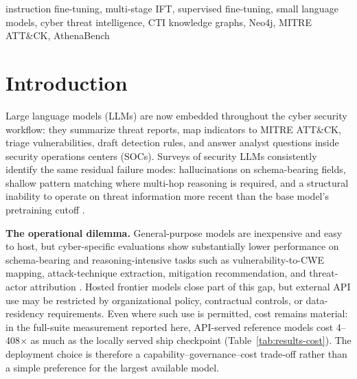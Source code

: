 \documentclass[conference]{IEEEtran}
\begin{document}
\begin{IEEEkeywords}
instruction fine-tuning, multi-stage IFT, supervised fine-tuning, small language models, cyber threat intelligence, CTI knowledge graphs, Neo4j, MITRE ATT\&CK, AthenaBench
\end{IEEEkeywords}

\section{Introduction}

Large language models (LLMs) are now embedded throughout the cyber security workflow: they summarize threat reports, map indicators to MITRE ATT\&CK, triage vulnerabilities, draft detection rules, and answer analyst questions inside security operations centers (SOCs). Surveys of security LLMs consistently identify the same residual failure modes: hallucinations on schema-bearing fields, shallow pattern matching where multi-hop reasoning is required, and a structural inability to operate on threat information more recent than the base model's pretraining cutoff \cite{levi2024cyberpal,liu2024cyberbench}.

\textbf{The operational dilemma.} General-purpose models are inexpensive and easy to host, but cyber-specific evaluations show substantially lower performance on schema-bearing and reasoning-intensive tasks such as vulnerability-to-CWE mapping, attack-technique extraction, mitigation recommendation, and threat-actor attribution \cite{ctibench2024,athenabench2025,liu2024cyberbench}. Hosted frontier models close part of this gap, but external API use may be restricted by organizational policy, contractual controls, or data-residency requirements. Even where such use is permitted, cost remains material: in the full-suite measurement reported here, API-served reference models cost 4--408$\times$ as much as the locally served ship checkpoint (Table~\ref{tab:results-cost}). The deployment choice is therefore a capability--governance--cost trade-off rather than a simple preference for the largest available model.
\end{document}

